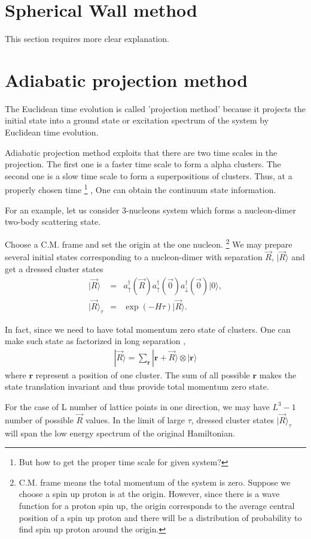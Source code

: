 \documentclass[10pt]{book}
\def\bm{\boldsymbol}
\newcommand{\bea}{\begin{eqnarray}}
\newcommand{\eea}{\end{eqnarray}}
\newcommand{\no}{\nonumber \\}
\def\vr{{\bm r}}
\def\ra{\rangle}
\begin{document}
\section{Spherical Wall method} 
{\color{red} This section requires more clear explanation.}

\section{Adiabatic projection method}
The Euclidean time evolution is called 'projection method'
because it projects the initial state into a ground state or
excitation spectrum of the system by Euclidean time evolution. 

Adiabatic projection method exploits that there are two time scales
in the projection. The first one is a faster time scale to form a 
alpha clusters. The second one is a slow time scale to form a superpositions
of clusters. 
Thus, at a {\color{red} properly chosen time }\footnote{
But how to get the proper time scale for given system?} , 
One can obtain the continuum state information. 

For an example, let us consider 3-nucleons system which forms a 
nucleon-dimer two-body scattering state. 

Choose a C.M. frame and set the origin at the one nucleon.
\footnote{C.M. frame means the total momentum of the system is zero. 
Suppose we choose a spin up proton is at the origin. 
However, since there is a wave function for a proton spin up,
the origin corresponds to the average central position of a 
spin up proton and there will be a distribution of probability to find 
spin up proton around the origin.
}  We may prepare several initial states corresponding to a nucleon-dimer
with separation ${\vec R}$, $|{\vec R}\ra$ and get a dressed cluster states
\bea 
|{\vec R}\ra &=& a^\dagger_{\uparrow}({\vec R})
                 a^\dagger_{\uparrow}({\vec 0})a^\dagger_{\downarrow}({\vec 0})|0\ra,\no 
|{\vec R}\ra_\tau &=& \exp(-H\tau)|{\vec R}\ra. 
\eea 
 
In fact, since we need to have total momentum zero state of clusters. 
One can make such state as factorized in long separation , 
\bea 
|{\vec R}\ra =\sum_{\vr} |\vr+{\vec R}\ra\otimes |\vr\ra 
\eea  
where $\vr$ represent a position of one cluster. The sum of all possible $\vr$
makes the state translation invariant and thus provide total momentum zero state.  
 
For the case of L number of lattice points in one direction,
we may have $L^3-1$ number of possible ${\vec R}$ values. 
In the limit of large $\tau$, 
dressed cluster states $|{\vec R}\ra_\tau$ will span the 
low energy spectrum of the original Hamiltonian. 
\end{document}
